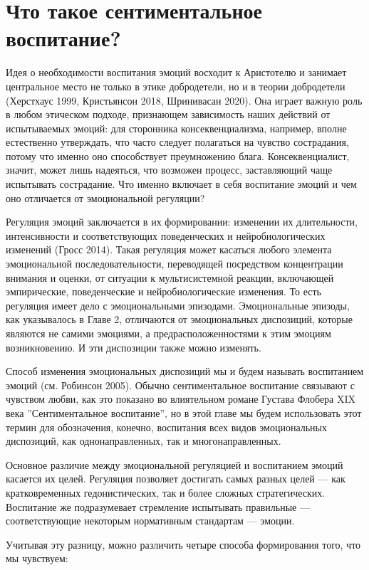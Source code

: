 \documentclass[11pt]{book}
\begin{document}
\section{Что такое сентиментальное воспитание?}

Идея о необходимости воспитания эмоций восходит к Аристотелю и занимает центральное место не только в этике добродетели, но и в теории добродетели (Херстхаус 1999, Кристьянсон 2018, Шринивасан 2020). Она играет важную роль в любом этическом подходе, признающем зависимость наших действий от испытываемых эмоций: для сторонника консеквенциализма, например, вполне естественно утверждать, что часто следует полагаться на чувство сострадания, потому что именно оно способствует преумножению блага. Консеквенциалист, значит, может лишь надеяться, что возможен процесс, заставляющий чаще испытывать сострадание. Что именно включает в себя воспитание эмоций и чем оно отличается от эмоциональной регуляции?

Регуляция эмоций заключается в их формировании: изменении их длительности, интенсивности и соответствующих поведенческих и нейробиологических изменений (Гросс 2014). Такая регуляция может касаться любого элемента эмоциональной последовательности, переводящей посредством концентрации внимания и оценки, от ситуации к мультисистемной реакции, включающей эмпирические, поведенческие и нейробиологические изменения. То есть регуляция имеет дело с эмоциональными эпизодами. Эмоциональные эпизоды, как указывалось в Главе 2, отличаются от эмоциональных диспозиций, которые являются не самими эмоциями, а предрасположенностями к этим эмоциям возникновению. И эти диспозиции также можно изменять.

Способ изменения эмоциональных диспозиций мы и будем называть воспитанием эмоций (см. Робинсон 2005). Обычно сентиментальное воспитание связывают с чувством любви, как это показано во влиятельном романе Густава Флобера XIX века ''Сентиментальное воспитание'', но в этой главе мы будем использовать этот термин для обозначения, конечно, воспитания всех видов эмоциональных диспозиций, как однонаправленных, так и многонаправленных.

Основное различие между эмоциональной регуляцией и воспитанием эмоций касается их целей. Регуляция позволяет достигать самых разных целей --- как кратковременных гедонистических, так и более сложных стратегических. Воспитание же подразумевает стремление испытывать правильные --- соответствующие некоторым нормативным стандартам --- эмоции.

Учитывая эту разницу, можно различить четыре способа формирования того, что мы чувствуем:
\end{document}
